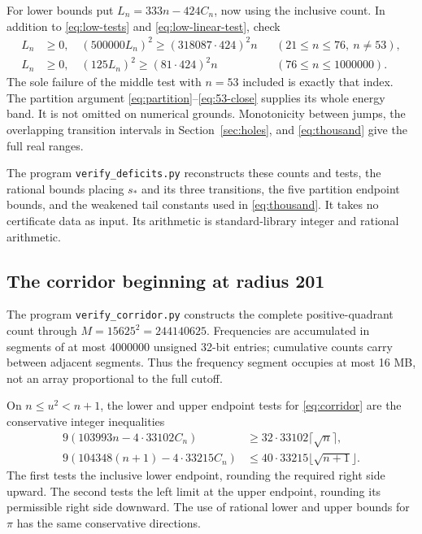 \documentclass[11pt,reqno]{amsart}
\numberwithin{equation}{section}
\begin{document}
For lower bounds put $L_n=333n-424C_n$, now using the
inclusive count. In addition to \eqref{eq:low-tests} and
\eqref{eq:low-linear-test}, check
\begin{align}
 L_n&\ge0,\quad
 (500000L_n)^2\ge(318087\cdot424)^2n
 &&(21\le n\le76,\ n\ne53),\label{eq:cert-hole-middle}\\
 L_n&\ge0,\quad
 (125L_n)^2\ge(81\cdot424)^2n
 &&(76\le n\le1000000).\label{eq:cert-hole-high}
\end{align}
The sole failure of the middle test with $n=53$ included
is exactly that index. The partition argument
\eqref{eq:partition}--\eqref{eq:53-close} supplies its whole
energy band. It is not omitted on numerical grounds.
Monotonicity between jumps, the overlapping transition
intervals in Section~\ref{sec:holes}, and
\eqref{eq:thousand} give the full real ranges.

The program \texttt{verify\_deficits.py} reconstructs these
counts and tests, the rational bounds placing $s_*$ and its
three transitions, the five partition endpoint bounds,
and the weakened tail constants used in \eqref{eq:thousand}.
It takes no certificate data as input. Its arithmetic is
standard-library integer and rational arithmetic.

\subsection*{The corridor beginning at radius 201}

The program \texttt{verify\_corridor.py} constructs the
complete positive-quadrant count through
$M=15625^2=244140625$. Frequencies are accumulated in
segments of at most 4000000 unsigned 32-bit entries;
cumulative counts carry between adjacent segments.
Thus the frequency segment occupies at most 16 MB, not an
array proportional to the full cutoff.

On $n\le u^2<n+1$, the lower and upper endpoint tests
for \eqref{eq:corridor} are the conservative integer
inequalities
\begin{align}
 9(103993n-4\cdot33102C_n)
     &\ge32\cdot33102\lceil\sqrt n\rceil,
                  \label{eq:corridor-low-test}\\
 9(104348(n+1)-4\cdot33215C_n)
     &\le40\cdot33215\lfloor\sqrt{n+1}\rfloor.
                  \label{eq:corridor-high-test}
\end{align}
The first tests the inclusive lower endpoint, rounding the
required right side upward. The second tests the left limit
at the upper endpoint, rounding its permissible right side
downward. The use of rational lower and upper bounds for
$\pi$ has the same conservative directions.
\end{document}
